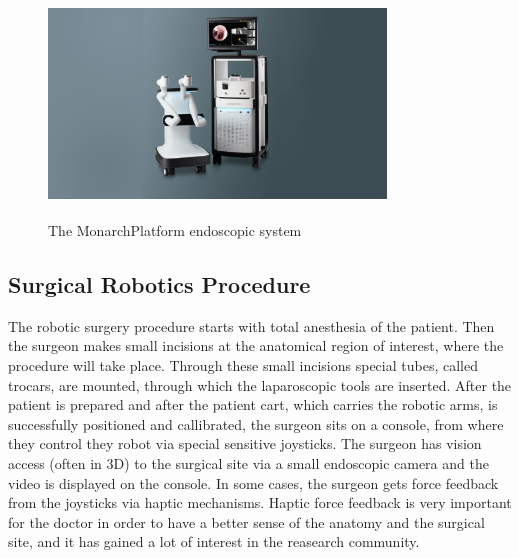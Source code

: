 \begin{center}
\begin{figure}[!htb]
\centering
\includegraphics[width=0.8\textwidth]{images/Moarch_Platform_1200_x_676_1_.jpg}\\
\caption[The Monarch\textsuperscript \texttrademark Platform endoscopic system]{The Monarch\textsuperscript \texttrademark Platform endoscopic system \footnotemark}
\end{figure}
\end{center}


\subsection{Surgical Robotics Procedure}

The robotic surgery procedure starts with total anesthesia of the patient. Then the surgeon makes small incisions at the anatomical region of interest, where the procedure will take place. Through 
these small incisions special tubes, called trocars, are mounted, through which the laparoscopic tools are inserted. After the patient is prepared and after the patient cart, which carries the robotic arms, 
is successfully positioned and callibrated, the surgeon sits on a console, from where they control they robot via special sensitive joysticks. The surgeon has vision access (often in 3D) to the surgical site via a
small endoscopic camera and the video is displayed on the console. In some cases, the surgeon gets force feedback from the joysticks via haptic mechanisms. Haptic force feedback is very important for the doctor 
in order to have a better sense of the anatomy and the surgical site, and it has gained a lot of interest in the reasearch community.

